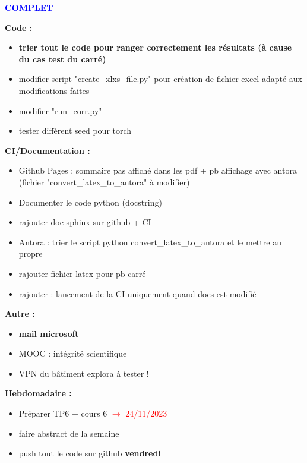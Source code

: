 \textcolor{blue}{\textbf{\large{COMPLET}}}

\textbf{Code :}
\begin{itemize}[label=$\square$] 
	\item[\done] \textbf{trier tout le code pour ranger correctement les résultats (à cause du cas test du carré)}
	\item[\done] modifier script "create\_xlxs\_file.py" pour création de fichier excel adapté aux modifications faites
	\item[\done] modifier "run\_corr.py"
	\item[\wontfix] tester différent seed pour torch
\end{itemize}
\textbf{CI/Documentation :}
\begin{itemize}[label=$\square$] 
	\item[\later] Github Pages : sommaire pas affiché dans les pdf + pb affichage avec antora (fichier "convert\_latex\_to\_antora" à modifier)
	\item[\later] Documenter le code python (docstring)
	\item[\later] rajouter doc sphinx sur github + CI
	\item[\later] Antora : trier le script python convert\_latex\_to\_antora et le mettre au propre
	\item[\later] rajouter fichier latex pour pb carré
	\item[\later] rajouter : lancement de la CI uniquement quand docs est modifié
\end{itemize}
\textbf{Autre :}
\begin{itemize}[label=$\square$] 
	\item[\wontfix] \textbf{mail microsoft}
	\item[\later] MOOC : intégrité scientifique
	\item[\later] VPN du bâtiment explora à tester !
\end{itemize}
\textbf{Hebdomadaire :}
\begin{itemize}[label=$\square$] 
	\item[\done] Préparer TP6 + cours 6 \textcolor{red}{$\rightarrow$ 24/11/2023}
	\item[\done] faire abstract de la semaine 
	\item[\done] push tout le code sur github \textbf{vendredi}
\end{itemize}